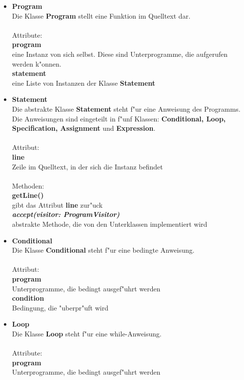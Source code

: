 \documentclass[10pt,a4paper,titlepage]{article}
\begin{document}
\begin{itemize}
\item \textbf{Program} \\
Die Klasse \textbf{Program} stellt eine Funktion im Quelltext dar. \\\\
Attribute: \\
\textbf{program} \\
eine Instanz von sich selbst. Diese sind Unterprogramme, die aufgerufen werden k"onnen.\\
\textbf{statement} \\
eine Liste von Instanzen der Klasse \textbf{Statement}
\item \textbf{Statement} \\
Die abstrakte Klasse \textbf{Statement} steht f"ur eine Anweisung des Programms. Die Anweisungen sind eingeteilt in f"unf Klassen: \textbf{Conditional, Loop, Specification, Assignment} und \textbf{Expression}. \\\\
Attribut:\\
\textbf{line} \\
Zeile im Quelltext, in der sich die Instanz befindet\\\\
Methoden: \\
\textbf{getLine()} \\
gibt das Attribut \textbf{line} zur"uck \\
\textbf{\textit{accept(visitor: ProgramVisitor)}}\\
abstrakte Methode, die von den Unterklassen implementiert wird
\item \textbf{Conditional} \\
Die Klasse \textbf{Conditional} steht f"ur eine bedingte Anweisung. \\\\
Attribut: \\
\textbf{program} \\
Unterprogramme, die bedingt ausgef"uhrt werden \\
\textbf{condition} \\
Bedingung, die "uberpr"uft wird
\item \textbf{Loop} \\
Die Klasse \textbf{Loop} steht f"ur eine while-Anweisung. \\\\
Attribute: \\
\textbf{program} \\
Unterprogramme, die bedingt ausgef"uhrt werden \\

\end{itemize}
\end{document}
